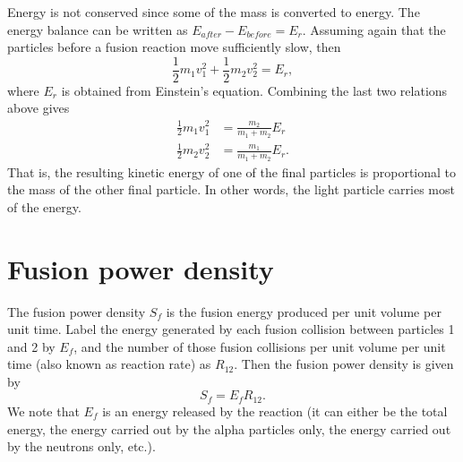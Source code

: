 \documentclass[../hedp.tex]{subfiles}
\begin{document}
Energy is not conserved since some of the mass is converted to energy. The energy balance can be written as $E_{after} - E_{before} = E_r$. Assuming again that the particles before a fusion reaction move sufficiently slow, then
\begin{equation}
\frac{1}{2} m_1 v_1^2 + \frac{1}{2} m_2 v_2^2 = E_r,
\end{equation}
where $E_r$ is obtained from Einstein's equation. Combining the last two relations above gives
\begin{align}
    \frac{1}{2} m_1 v_1^2 &= \frac{m_2}{m_1 + m_2} E_r \nonumber \\
    \frac{1}{2} m_2 v_2^2 &= \frac{m_1}{m_1 + m_2} E_r.
\end{align}
That is, the resulting kinetic energy of one of the final particles is proportional to the mass of the other final particle. In other words, the light particle carries most of the energy.

\section{Fusion power density}
The fusion power density $S_f$ is the fusion energy produced per unit volume per unit time. Label the energy generated by each fusion collision between particles 1 and 2 by $E_f$, and the number of those fusion collisions per unit volume per unit time (also known as reaction rate) as $R_{12}$. Then the fusion power density is given by 
\begin{equation}
    S_f = E_f R_{12}.
\end{equation}
We note that $E_f$ is an energy released by the reaction (it can either be the total energy, the energy carried out by the alpha particles only, the energy carried out by the neutrons only, etc.). 
\end{document}
